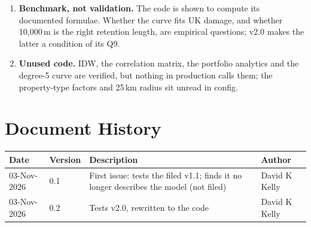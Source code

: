 \documentclass[11pt,a4paper]{article}
\renewcommand{\mkmhistorypage}[1]{%
    \section{Document History}
    \begin{table}[ht]
        \centering
        \begin{tabular}{l|l|p{9cm}|l}
            \textbf{Date} & \textbf{Version} & \textbf{Description} & \textbf{Author} \\
            \hline
            #1
        \end{tabular}
    \end{table}
}
\begin{document}
\mkmlimitations

\begin{enumerate}[leftmargin=*]
\item \textbf{Benchmark, not validation.} The code is shown to compute its documented
  formulae. Whether the curve fits UK damage, and whether 10{,}000\,m is the right
  retention length, are empirical questions; v2.0 makes the latter a condition of its
  Q9.
\item \textbf{Unused code.} IDW, the correlation matrix, the portfolio analytics and
  the degree-5 curve are verified, but nothing in production calls them; the
  property-type factors and 25\,km radius sit unread in config.
\end{enumerate}

\mkmhistorypage{03-Nov-2026 & 0.1 & First issue: tests the filed v1.1; finds it no longer describes the model (not filed) & David K Kelly \\
03-Nov-2026 & 0.2 & Tests v2.0, rewritten to the code & David K Kelly \\}
\end{document}
